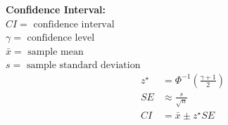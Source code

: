 \documentclass[12pt,letterpaper,addpoints]{exam}
\begin{document}
\begin{multicols}{2}
{\bf Confidence Interval:}\\
$CI = \text{ confidence interval}$\\
$\gamma = \text{ confidence level}$\\
$\bar{x} = \text{ sample mean}$ \\
$s = \text{ sample standard deviation}$ 
\begin{align*}
z^{\star} &= \Phi^{-1}\left(\frac{\gamma+1}{2} \right) \\
SE &\approx \frac{s}{\sqrt{n}}\\
CI &= \bar{x} \pm z^{\star} SE
\end{align*}


\end{multicols}



%
%
%
%
\end{document}
